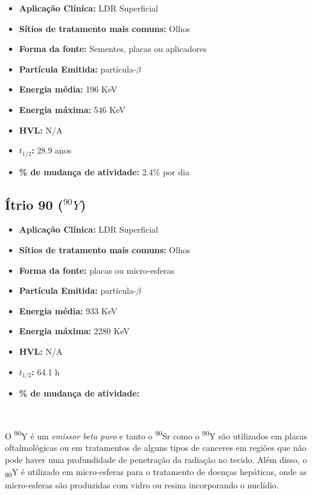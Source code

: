 \documentclass[11pt,a4paper]{article}
\begin{document}
			\begin{itemize}
				\item \textbf{Aplicação Clínica:} LDR Superficial
				\item \textbf{Sítios de tratamento mais comuns:} Olhos
				\item \textbf{Forma da fonte:} Sementes, placas ou aplicadores
				\item \textbf{Partícula Emitida:} partícula-$\beta$
				\item \textbf{Energia média: } 196 KeV 
				\item \textbf{Energia máxima: } 546 KeV
				\item \textbf{HVL:} N/A
				\item \textbf{$t_{1/2}$:} 28.9 anos
				\item \textbf{\% de mudança de atividade: } 2.4\% por dia
			\end{itemize}


		\subsection{Ítrio 90 \textbf{\textcolor{CarnationPink}{(${}^{90}Y$)}}}

			\begin{itemize}
				\item \textbf{Aplicação Clínica:} LDR Superficial
				\item \textbf{Sítios de tratamento mais comuns:} Olhos
				\item \textbf{Forma da fonte:} placas ou micro-esferas
				\item \textbf{Partícula Emitida:} partícula-$\beta$
				\item \textbf{Energia média: } 933 KeV 
				\item \textbf{Energia máxima: } 2280 KeV
				\item \textbf{HVL:} N/A
				\item \textbf{$t_{1/2}$:} 64.1 h
				\item \textbf{\% de mudança de atividade: } 
			\end{itemize}

		\

			O \textsuperscript{90}Y é um \textit{\textcolor{CarnationPink}{emissor beta puro}} e tanto o \textsuperscript{90}Sr como o \textsuperscript{90}Y são utilizados em placas oftalmológicas ou em tratamentos de alguns tipos de canceres em regiões que não pode haver uma profundidade de penetração da radiação no tecido. Além disso, o \textsubscript{90}Y é utilizado em micro-esferas para o tratamento de doenças hepáticas, onde as micro-esferas são produzidas com vidro ou resina incorporando o nuclídio.
\end{document}

